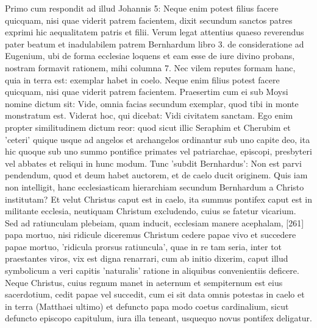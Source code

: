 Primo cum respondit ad illud Johannis 5: Neque enim potest filius facere quicquam, nisi quae viderit patrem facientem, dixit secundum sanctos patres exprimi hic aequalitatem patris et filii. Verum legat attentius quaeso reverendus pater beatum et inadulabilem patrem Bernhardum libro 3. de consideratione ad Eugenium, ubi de forma ecclesiae loquens et eam esse de iure divino probans, nostram formavit rationem, mihi columna 7. Nec vilem reputes formam hanc, quia in terra est: exemplar habet in coelo. Neque enim filius potest facere quicquam, nisi quae viderit patrem facientem. Praesertim cum ei sub Moysi nomine dictum sit: Vide, omnia facias secundum exemplar, quod tibi in monte monstratum est. Viderat hoc, qui dicebat: Vidi civitatem sanctam. Ego enim propter similitudinem dictum reor: quod sicut illic Seraphim et Cherubim et 'ceteri' quique usque ad angelos et archangelos ordinantur sub uno capite deo, ita hic quoque sub uno summo pontifice primates vel patriarchae, episcopi, presbyteri vel abbates et reliqui in hunc modum. Tunc 'subdit Bernhardus': Non est parvi pendendum, quod et deum habet auctorem, et de caelo ducit originem. Quis iam non intelligit, hanc ecclesiasticam hierarchiam secundum Bernhardum a Christo institutam? Et velut Christus caput est in caelo, ita summus pontifex caput est in militante ecclesia, neutiquam Christum excludendo, cuius se fatetur vicarium. Sed ad ratiunculam plebeiam, quam inducit, ecclesiam manere acephalam, [261] papa mortuo, nisi ridicule diceremus Christum cedere papae vivo et succedere papae mortuo, 'ridicula prorsus ratiuncula', quae in re tam seria, inter tot praestantes viros, vix est digna renarrari, cum ab initio dixerim, caput illud symbolicum a veri capitis 'naturalis' ratione in aliquibus convenientiis deficere. Neque Christus, cuius regnum manet in aeternum et sempiternum est eius sacerdotium, cedit papae vel succedit, cum ei sit data omnis potestas in caelo et in terra (Matthaei ultimo) et defuncto papa modo coetus cardinalium, sicut defuncto episcopo capitulum, iura illa teneant, usquequo novus pontifex deligatur.

